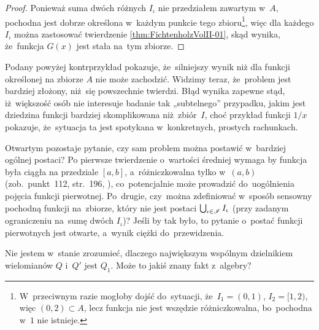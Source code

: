 \documentclass[a4paper,11pt]{article}
\begin{document}
\begin{proof}

  Ponieważ suma dwóch różnych $I_{ \iota }$ nie przedziałem zawartym
  w~$A$, pochodna jest dobrze określona w~każdym punkcie tego
  zbioru\footnote{W~przeciwnym razie mogłoby dojść do~sytuacji,
    że~$I_{ 1 } = (0, 1)$, $I_{ 2 } = [ 1, 2 )$, więc
    $( 0, 2 ) \subset A$, lecz funkcja nie jest wszędzie
    różniczkowalna, bo~pochodna w~$1$ nie istnieje.}, więc dla każdego
  $I_{ \iota }$ można zastosować twierdzenie
  \ref{thm:FichtenholzVolII-01}, skąd wynika, że~funkcja $G( x )$ jest
  stała na~tym zbiorze.

\end{proof}





Podany powyżej kontrprzykład pokazuje, że~silniejszy wynik niż dla
funkcji określonej na zbiorze $A$ nie może zachodzić. Widzimy teraz,
że~problem jest bardziej złożony, niż~się powszechnie twierdzi. Błąd
wynika zapewne stąd, iż~większość osób nie interesuje badanie tak
„subtelnego” przypadku, jakim jest dziedzina funkcji bardziej
skomplikowana niż~zbiór~$I$, choć przykład funkcji $1 / x$ pokazuje,
że~sytuacja ta jest spotykana w~konkretnych, prostych rachunkach.

Otwartym pozostaje pytanie, czy sam problem można postawić w~bardziej
ogólnej postaci? Po pierwsze twierdzenie o~wartości średniej wymaga by
funkcja była ciągła na przedziale $[ a, b ]$, a~różniczkowalna tylko
w~$( a, b )$ (zob.~punkt~112, str.~196,
\cite{FichtenholzRachunekRozniczkowyETCVolI2005}), co~potencjalnie
może prowadzić do~uogólnienia pojęcia funkcji pierwotnej. Po~drugie,
czy~można zdefiniować w~sposób sensowny pochodną funkcji na~zbiorze,
który nie jest postaci $\bigcup_{ \iota \in \mathcal{I} } I_{ \iota }$ (przy
zadanym ograniczeniu na~sumę dwóch $I_{ \iota }$)? Jeśli by tak było,
to pytanie o~postać funkcji pierwotnych jest otwarte, a~wynik ciężki
do~przewidzenia.

\vspace{\spaceFour}



\start {} Nie jestem w~stanie zrozumieć, dlaczego największym
wspólnym dzielnikiem wielomianów $Q$ i~$Q'$ jest $Q_{ 1 }$. Może to
jakiś znany fakt z~algebry? \Dok

\vspace{\spaceFour}
\end{document}
